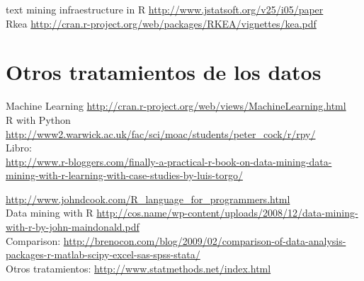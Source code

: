 text mining infraestructure in R \url{http://www.jstatsoft.org/v25/i05/paper}\\

Rkea \url{http://cran.r-project.org/web/packages/RKEA/vignettes/kea.pdf}\\
\section{Otros tratamientos de los datos}
Machine Learning \url{http://cran.r-project.org/web/views/MachineLearning.html}\\

R with Python \url{http://www2.warwick.ac.uk/fac/sci/moac/students/peter_cock/r/rpy/}\\


Libro:\\
\url{http://www.r-bloggers.com/finally-a-practical-r-book-on-data-mining-data-mining-with-r-learning-with-case-studies-by-luis-torgo/}


\url{http://www.johndcook.com/R_language_for_programmers.html}\\

Data mining with R \url{http://cos.name/wp-content/uploads/2008/12/data-mining-with-r-by-john-maindonald.pdf}\\

Comparison: \url{http://brenocon.com/blog/2009/02/comparison-of-data-analysis-packages-r-matlab-scipy-excel-sas-spss-stata/}\\

Otros tratamientos: \url{http://www.statmethods.net/index.html}\\

